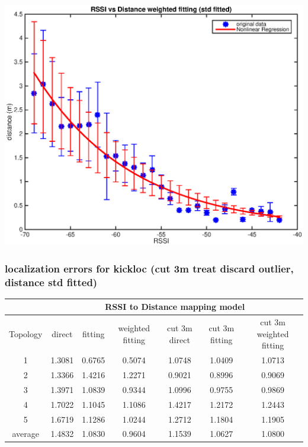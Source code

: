 \documentclass[11pt]{beamer}
\begin{document}
\begin{frame}
\includegraphics[width=\textwidth]{rssi_dis_weighted_std_fitting.eps} 
\end{frame}

\begin{frame}
\frametitle{localization errors for kickloc (cut 3m treat discard outlier, distance std fitted)}
\tiny
\begin{tabular}{|c|c|c|c|c|c|c|}
\hline 
 & \multicolumn{6}{c|}{RSSI to Distance mapping model} \\ 
\hline 
Topology & direct  & fitting & weighted fitting & cut 3m direct & cut 3m fitting & cut 3m weighted fitting \\ 
\hline
1 & 1.3081 & 0.6765 & 0.5074 & 1.0748 & 1.0409 & 1.0713 \\
\hline
2 & 1.3366 & 1.4216 & 1.2271 & 0.9021 & 0.8996 & 0.9069 \\
\hline
3 & 1.3971 & 1.0839 & 0.9344 & 1.0996 & 0.9755 & 0.9869 \\
\hline
4 & 1.7022 & 1.1045 & 1.1086 & 1.4217 & 1.2172 & 1.2443 \\
\hline
5 & 1.6719 & 1.1286 & 1.0244 & 1.2712 & 1.1804 & 1.1905 \\
\hline
average & 1.4832 & 1.0830 & 0.9604 & 1.1539 & 1.0627 & 1.0800 \\
\hline 
\end{tabular} 
\end{frame}
\end{document}
